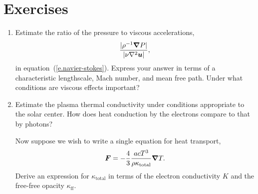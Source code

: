 \section{Exercises}\label{s.plasma-exercises}
\begin{enumerate}

\item Estimate the ratio of the pressure to viscous accelerations,
\[ \frac{|\rho^{-1}\boldsymbol{\nabla} P|}{|\nu\nabla^{2}\boldsymbol{u}|} ,\]
in equation~(\ref{e.navier-stokes}).  Express your answer in terms of a characteristic lengthscale, Mach number, and mean free path.  Under what conditions are viscous effects important?

\item Estimate the plasma thermal conductivity under conditions appropriate to the solar center. How does heat conduction by the electrons compare to that by photons?

Now suppose we wish to write a single equation for heat transport,
\[
\boldsymbol{F} =  -\frac{4}{3} \frac{acT^{3}}{\rho\kappa_{\mathrm{total}}}\boldsymbol{\nabla} T.
 \]
Derive an expression for $\kappa_{\mathrm{total}}$ in terms of the electron conductivity $K$ and the free-free opacity $\kappa_{\mathrm{ff}}$.  

\end{enumerate}
